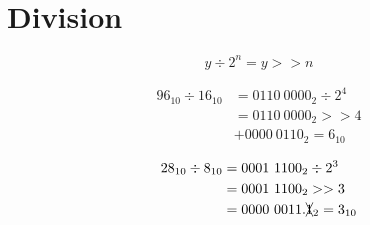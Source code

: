 \documentclass{article}
\begin{document}
\section{Division}

\[ y \div 2^n = y >> n \]

\begin{align*}
96_{10} \div 16_{10} &= 0110\ 0000_2 \div 2^4 \\
                     &= 0110\ 0000_2 >> 4 \\
                     &+ 0000\ 0110_2 = 6_{10}
\end{align*}

\begin{align*}
28_{10} \div 8_{10} &= 0001\ 1100_2 \div 2^3 \\
                    &= 0001\ 1100_2 >> 3 \\
                    &= 0000\ 0011.\xcancel{1}_2 = 3_{10}
\end{align*}
\end{document}
